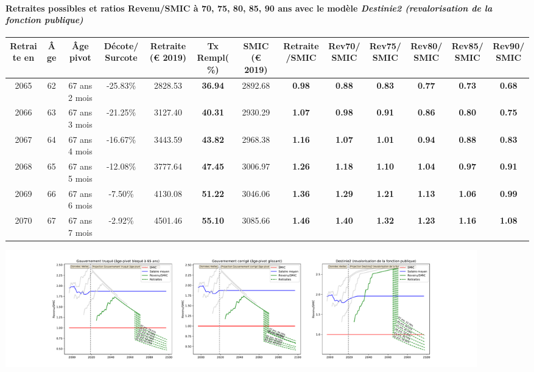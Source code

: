 \paragraph{Retraites possibles et ratios Revenu/SMIC à 70, 75, 80, 85, 90 ans avec le modèle \emph{Destinie2 (revalorisation de la fonction publique)}}  
 
{ \scriptsize \begin{center} 
\begin{tabular}[htb]{|c|c||c|c||c|c||c||c|c|c|c|c|c|} 
\hline 
 Retraite en &  Âge &  Âge pivot &  Décote/Surcote &  Retraite (\euro{} 2019) &  Tx Rempl(\%) &  SMIC (\euro{} 2019) &  Retraite/SMIC &  Rev70/SMIC &  Rev75/SMIC &  Rev80/SMIC &  Rev85/SMIC &  Rev90/SMIC \\ 
\hline \hline 
 2065 &  62 &  67 ans 2 mois &  -25.83\% &  2828.53 &  {\bf 36.94} &  2892.68 &  {\bf {\color{red} 0.98}} &  {\bf {\color{red} 0.88}} &  {\bf {\color{red} 0.83}} &  {\bf {\color{red} 0.77}} &  {\bf {\color{red} 0.73}} &  {\bf {\color{red} 0.68}} \\ 
\hline 
 2066 &  63 &  67 ans 3 mois &  -21.25\% &  3127.40 &  {\bf 40.31} &  2930.29 &  {\bf 1.07} &  {\bf {\color{red} 0.98}} &  {\bf {\color{red} 0.91}} &  {\bf {\color{red} 0.86}} &  {\bf {\color{red} 0.80}} &  {\bf {\color{red} 0.75}} \\ 
\hline 
 2067 &  64 &  67 ans 4 mois &  -16.67\% &  3443.59 &  {\bf 43.82} &  2968.38 &  {\bf 1.16} &  {\bf 1.07} &  {\bf 1.01} &  {\bf {\color{red} 0.94}} &  {\bf {\color{red} 0.88}} &  {\bf {\color{red} 0.83}} \\ 
\hline 
 2068 &  65 &  67 ans 5 mois &  -12.08\% &  3777.64 &  {\bf 47.45} &  3006.97 &  {\bf 1.26} &  {\bf 1.18} &  {\bf 1.10} &  {\bf 1.04} &  {\bf {\color{red} 0.97}} &  {\bf {\color{red} 0.91}} \\ 
\hline 
 2069 &  66 &  67 ans 6 mois &  -7.50\% &  4130.08 &  {\bf 51.22} &  3046.06 &  {\bf 1.36} &  {\bf 1.29} &  {\bf 1.21} &  {\bf 1.13} &  {\bf 1.06} &  {\bf {\color{red} 0.99}} \\ 
\hline 
 2070 &  67 &  67 ans 7 mois &  -2.92\% &  4501.46 &  {\bf 55.10} &  3085.66 &  {\bf 1.46} &  {\bf 1.40} &  {\bf 1.32} &  {\bf 1.23} &  {\bf 1.16} &  {\bf 1.08} \\ 
\hline 
\hline 
\end{tabular} 
\end{center} } 

 \begin{center}\includegraphics[width=0.9\textwidth]{fig/ProfEcoles_2003_22_dest_retraite.pdf}\end{center} \label{fig/ProfEcoles_2003_22_dest_retraite.pdf} 

